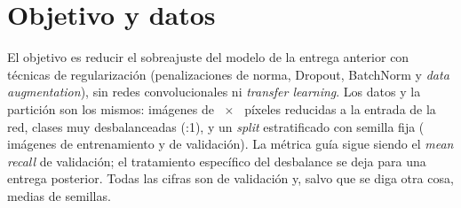 \section{Objetivo y datos}
El objetivo es reducir el sobreajuste del modelo de la entrega anterior con técnicas de regularización
(penalizaciones de norma, Dropout, BatchNorm y \emph{data augmentation}), sin redes convolucionales ni
\emph{transfer learning}. Los datos y la partición son los mismos:  imágenes de
~$\times$~ píxeles reducidas a la entrada de la red,  clases muy
desbalanceadas (:1), y un \emph{split} estratificado con semilla fija ( imágenes de
entrenamiento y  de validación). La métrica guía sigue siendo el \emph{mean recall} de validación; el
tratamiento específico del desbalance se deja para una entrega posterior. Todas las cifras son de validación y, salvo
que se diga otra cosa, medias de  semillas.
